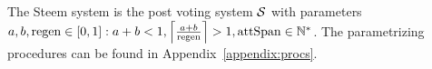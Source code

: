 \begin{definition}
  The Steem system is the post voting system $\pvs$ with parameters $a, b,
  \regen \in \left[0, 1\right]: a + b < 1, \ceil*{\frac{a + b}{\regen}} > 1,
  \attspan \in \mathbb{N}^*$. The parametrizing procedures can be found in
  Appendix~\ref{appendix:procs}.
\end{definition}

